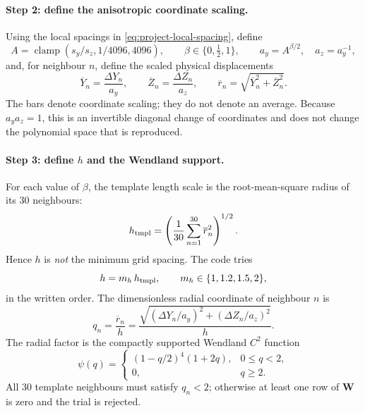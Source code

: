 \documentclass[11pt,a4paper]{article}
\begin{document}
\paragraph{Step 2: define the anisotropic coordinate scaling.}
Using the local spacings in \eqref{eq:project-local-spacing}, define
\begin{equation}
 A=\operatorname{clamp}(s_y/s_z,1/4096,4096),\qquad
 \beta\in\{0,\tfrac12,1\},\qquad
 a_y=A^{\beta/2},\quad a_z=a_y^{-1},
\label{eq:beta-ladder}
\end{equation}
and, for neighbour $n$, define the scaled physical displacements
\begin{equation}
 \overline Y_n=\frac{\Delta Y_n}{a_y},\qquad
 \overline Z_n=\frac{\Delta Z_n}{a_z},\qquad
 \overline r_n=\sqrt{\overline Y_n^2+\overline Z_n^2}.
\label{eq:project-scaled-displacement}
\end{equation}
The bars denote coordinate scaling; they do not denote an average. Because
$a_ya_z=1$, this is an invertible diagonal change of coordinates and does not change the
polynomial space that is reproduced.

\paragraph{Step 3: define $h$ and the Wendland support.}
For each value of $\beta$, the template length scale is the root-mean-square radius of
its 30 neighbours:
\begin{equation}
 h_{\rm tmpl}=
 \left(\frac1{30}\sum_{n=1}^{30}\overline r_n^2\right)^{1/2}.
\label{eq:project-template-h}
\end{equation}
Hence $h$ is \emph{not} the minimum grid spacing. The code tries
\[
 h=m_h\,h_{\rm tmpl},\qquad m_h\in\{1,1.2,1.5,2\},
\]
in the written order. The dimensionless radial coordinate of neighbour $n$ is
\begin{equation}
 q_n=\frac{\overline r_n}{h}
 =\frac{\sqrt{(\Delta Y_n/a_y)^2+(\Delta Z_n/a_z)^2}}{h}.
\label{eq:active-support}
\end{equation}
The radial factor is the compactly supported Wendland $C^2$ function
\begin{equation}
 \psi(q)=
 \begin{cases}
  (1-q/2)^4(1+2q), & 0\le q<2,\\
  0, & q\ge2.
 \end{cases}
\label{eq:project-wendland-c2}
\end{equation}
All 30 template neighbours must satisfy $q_n<2$; otherwise at least one row of
$\bm W$ is zero and the trial is rejected.
\end{document}

